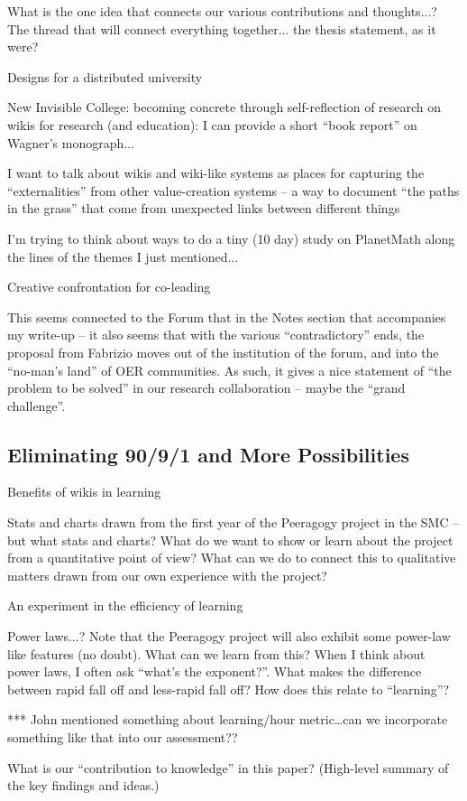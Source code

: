 \documentclass{acm_proc_article-sp}
\newenvironment{cframed}[1][blue]
  {\def\FrameCommand{\fboxsep=\FrameSep\fcolorbox{#1}{white}}%
    \MakeFramed {\advance\hsize-\width \FrameRestore}}
  {\endMakeFramed}
\begin{document}
\begin{cframed}[scarlet]
        What is the one idea that connects our various contributions and thoughts...? The thread that will connect everything together... the thesis statement, as it were?

    Designs for a distributed university

        New Invisible College: becoming concrete through self-reflection of research on wikis for research (and education): I can provide a short ``book report'' on Wagner's monograph...

        I want to talk about wikis and wiki-like systems as places for capturing the ``externalities'' from other value-creation systems -- a way to document ``the paths in the grass'' that come from unexpected links between different things

        I'm trying to think about ways to do a tiny (10 day) study on PlanetMath along the lines of the themes I just mentioned...

    Creative confrontation for co-leading

        This seems connected to the Forum that in the Notes section that accompanies my write-up -- it also seems that with the various ``contradictory'' ends, the proposal from Fabrizio moves out of the institution of the forum, and into the ``no-man's land'' of OER communities. As such, it gives a nice statement of ``the problem to be solved'' in our research collaboration -- maybe the ``grand challenge''.

\subsection{Eliminating 90/9/1 and More Possibilities}

    Benefits of wikis in learning

        Stats and charts drawn from the first year of the Peeragogy project in the SMC -- but what stats and charts? What do we want to show or learn about the project from a quantitative point of view? What can we do to connect this to qualitative matters drawn from our own experience with the project?

    An experiment in the efficiency of learning

        Power laws...? Note that the Peeragogy project will also exhibit some power-law like features (no doubt). What can we learn from this? When I think about power laws, I often ask ``what's the exponent?''. What makes the difference between rapid fall off and less-rapid fall off? How does this relate to ``learning''?

*** John mentioned something about learning/hour metric\ldots can we incorporate something like that into our assessment??

        What is our ``contribution to knowledge'' in this paper? (High-level summary of the key findings and ideas.)
\cite{Peeragogy-2}
\cite{College}
\cite{peer}
\cite{Gluing}
\cite{GroupInformatics}
\cite{Why}
\cite{PeeragogyinAction}
\end{cframed}
\end{document}
